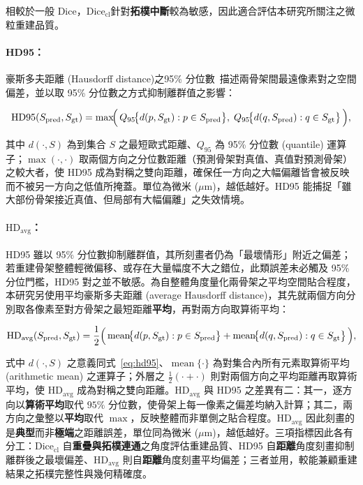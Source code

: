 \noindent 相較於一般 Dice，$\text{Dice}_{\text{cl}}$針對\textbf{拓樸中斷}較為敏感，因此適合評估本研究所關注之微粒重建品質。

\paragraph{HD95：} 豪斯多夫距離 (Hausdorff distance)之95\% 分位數~\cite{huttenlocher2002comparing}描述兩骨架間最遠像素對之空間偏差，並以取 95\% 分位數之方式抑制離群值之影響：

\begin{equation}
  \text{HD95}(S_{\text{pred}}, S_{\text{gt}}) = \max\!\Bigl(\, Q_{95}\!\bigl\{d(p, S_{\text{gt}}) : p \in S_{\text{pred}}\bigr\},\; Q_{95}\!\bigl\{d(q, S_{\text{pred}}) : q \in S_{\text{gt}}\bigr\}\,\Bigr),
  \label{eq:hd95}
\end{equation}

\noindent 其中 $d(\cdot, S)$ 為到集合 $S$ 之最短歐式距離、$Q_{95}$ 為 95\% 分位數 (quantile) 運算子；$\max(\cdot, \cdot)$ 取兩個方向之分位數距離（預測骨架對真值、真值對預測骨架）之較大者，使 HD95 成為對稱之雙向距離，確保任一方向之大幅偏離皆會被反映而不被另一方向之低值所掩蓋。單位為微米 ($\mu$m)，越低越好。HD95 能捕捉「雖大部份骨架接近真值、但局部有大幅偏離」之失效情境。

\paragraph{$\text{HD}_{\text{avg}}$：} HD95 雖以 95\% 分位數抑制離群值，其所刻畫者仍為「最壞情形」附近之偏差；若重建骨架整體輕微偏移、或存在大量幅度不大之錯位，此類誤差未必觸及 95\% 分位門檻，HD95 對之並不敏感。為自整體角度量化兩骨架之平均空間貼合程度，本研究另使用平均豪斯多夫距離 (average Hausdorff distance)，其先就兩個方向分別取各像素至對方骨架之最短距離\textbf{平均}，再對兩方向取算術平均：

\begin{equation}
  \text{HD}_{\text{avg}}(S_{\text{pred}}, S_{\text{gt}}) = \frac{1}{2}\Bigl(\, \operatorname{mean}\!\bigl\{d(p, S_{\text{gt}}) : p \in S_{\text{pred}}\bigr\} + \operatorname{mean}\!\bigl\{d(q, S_{\text{pred}}) : q \in S_{\text{gt}}\bigr\} \,\Bigr),
  \label{eq:avghd}
\end{equation}

\noindent 式中 $d(\cdot, S)$ 之意義同式~\eqref{eq:hd95}、$\operatorname{mean}\{\cdot\}$ 為對集合內所有元素取算術平均 (arithmetic mean) 之運算子；外層之 $\tfrac{1}{2}(\cdot + \cdot)$ 則對兩個方向之平均距離再取算術平均，使 $\text{HD}_{\text{avg}}$ 成為對稱之雙向距離。$\text{HD}_{\text{avg}}$ 與 HD95 之差異有二：其一，逐方向以\textbf{算術平均}取代 $95\%$ 分位數，使骨架上每一像素之偏差均納入計算；其二，兩方向之彙整以\textbf{平均}取代 $\max$，反映整體而非單側之貼合程度。$\text{HD}_{\text{avg}}$ 因此刻畫的是\textbf{典型}而非\textbf{極端}之距離誤差，單位同為微米 ($\mu$m)，越低越好。三項指標因此各有分工：$\text{Dice}_{\text{cl}}$ 自\textbf{重疊與拓樸連通}之角度評估重建品質、HD95 自\textbf{距離}角度刻畫抑制離群後之最壞偏差、$\text{HD}_{\text{avg}}$ 則自\textbf{距離}角度刻畫平均偏差；三者並用，較能兼顧重建結果之拓樸完整性與幾何精確度。

